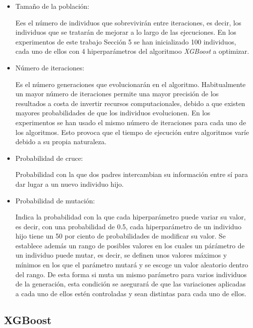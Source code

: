             \begin{itemize}

                \item Tamaño de la población:

                Ees el número de individuos que sobrevivirán entre iteraciones, es decir, los individuos que se tratarán de mejorar a lo largo de las ejecuciones. En los experimentos de este trabajo Sección 5 se han inicializado 100 individuos, cada uno de ellos con 4 hiperparámetros del algoritmoo \textit{XGBoost} a optimizar.

                \item Número de iteraciones:

                Es el número generaciones que evolucionarán en el algoritmo. Habitualmente un mayor número de iteraciones permite una mayor precisión de los resultados a costa de invertir recursos computacionales, debido a que existen mayores probabilidades de que los individuos evolucionen. En los experimentos se han usado el mismo número de iteraciones para cada uno de los algoritmos. Esto provoca que el tiempo de ejecución entre algoritmos varíe debido a su propia naturaleza.

                \item Probabilidad de cruce:

                Probabilidad con la que dos padres intercambian su información entre sí para dar lugar a un nuevo individuo hijo.

                \item Probabilidad de mutación:

                Indica la probabilidad con la que cada hiperparámetro puede variar su valor, es decir, con una probabilidad de 0.5, cada hiperparámetro de un individuo hijo tiene un 50 por ciento de probabilidades de modificar su valor. Se establece además un rango de posibles valores en los cuales un párámetro de un individuo puede mutar, es decir, se definen unos valores máximos y mínimos en los que el parámetro mutará y se escoge un valor aleatorio dentro del rango. De esta forma si muta un mismo parámetro para varios individuos de la generación, esta condición se asegurará de que las variaciones aplicadas a cada uno de ellos estén controladas y sean distintas para cada uno de ellos.

            \end{itemize}


        \subsection {XGBoost}

